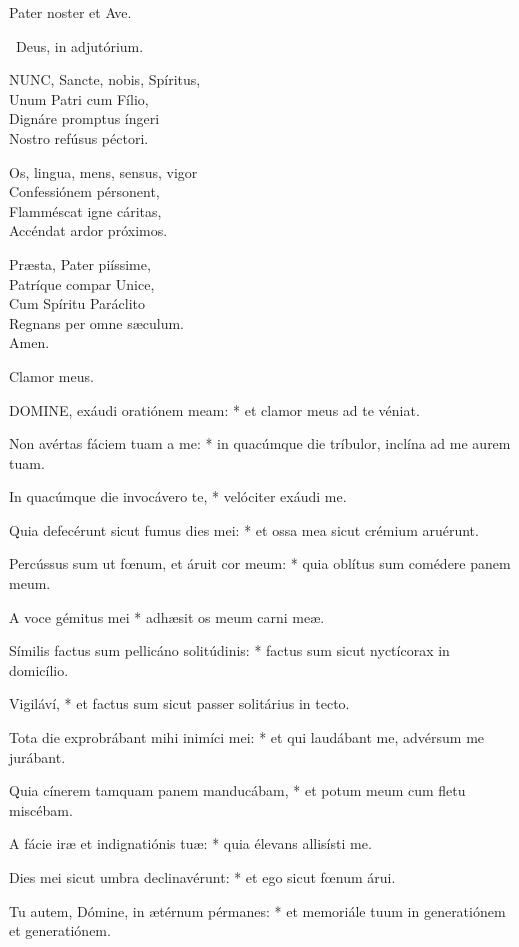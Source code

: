 Pater noster et Ave.

\V\ Deus, in adjutórium.


\lettrine[lines=2]{N}{UNC}, Sancte, nobis, Spíritus,\\
Unum Patri cum Fílio,\\
Dignáre promptus íngeri\\
Nostro refúsus péctori.

Os, lingua, mens, sensus, vigor\\
Confessiónem pérsonent,\\
Flamméscat igne cáritas,\\
Accéndat ardor próximos.

Præsta, Pater piíssime,\\
Patríque compar Unice,\\
Cum Spíritu Paráclito\\
Regnans per omne sæculum.\\
Amen.

 Clamor meus.


\lettrine[lines=2]{D}{OMINE}, exáudi oratiónem meam: * et clamor meus ad te véniat.

Non avértas fáciem tuam a me: * in quacúmque die tríbulor, inclína ad me aurem tuam.

In quacúmque die invocávero te, * velóciter exáudi me.

Quia defecérunt sicut fumus dies mei: * et ossa mea sicut crémium aruérunt.

Percússus sum ut fœnum, et áruit cor meum: * quia oblítus sum comédere panem meum.

A voce gémitus mei * adhæsit os meum carni meæ.

Símilis factus sum pellicáno solitúdinis: * factus sum sicut nyctícorax in domicílio.

Vigiláví, * et factus sum sicut passer solitárius in tecto.

Tota die exprobrábant mihi inimíci mei: * et qui laudábant me, advérsum me jurábant.

Quia cínerem tamquam panem manducábam, * et potum meum cum fletu miscébam.

A fácie iræ et indignatiónis tuæ: * quia élevans allisísti me.

Dies mei sicut umbra declinavérunt: * et ego sicut fœnum árui.

Tu autem, Dómine, in ætérnum pérmanes: * et memoriále tuum in generatiónem et generatiónem.

